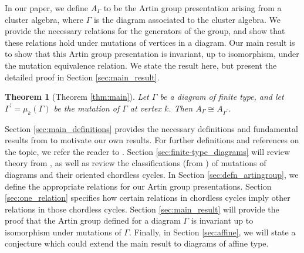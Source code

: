 \documentclass[11pt]{amsart}
\newtheorem{thm}{Theorem}[section]
\theoremstyle{definition}
\begin{document}


In our paper, we define $A_{\Gamma}$ to be the Artin group presentation arising from a cluster algebra, where $\Gamma$ is the diagram associated to the cluster algebra. We provide the necessary relations for the generators of the group, and show that these relations hold under mutations of vertices in a diagram. Our main result is to show that this Artin group presentation is invariant, up to isomorphism, under the mutation equivalence relation. We state the result here, but present the detailed proof in Section \ref{sec:main_result}.

\begin{thm}[Theorem \ref{thm:main}]
Let $\Gamma$ be a diagram of finite type, and let $\Gamma^{\prime} = \mu_k(\Gamma)$ be the mutation of $\Gamma$ at vertex $k$. Then $A_{\Gamma} \cong A_{\Gamma^{\prime}}$.
\end{thm}


\indent Section \ref{sec:main_definitions} provides the necessary definitions and fundamental results from \cite{BM13} to motivate our own results. For further definitions and references on the topic, we refer the reader to \cite{FZ02}. Section \ref{sec:finite-type_diagrams} will review theory from \cite{FZ02}, \cite{FZ03} as well as review the classifications (from \cite{BM13}) of mutations of diagrams and their oriented chordless cycles. In Section \ref{sec:defn_artingroup}, we define the appropriate relations for our Artin group presentations. Section \ref{sec:one_relation} specifies how certain relations in chordless cycles imply other relations in those chordless cycles. Section \ref{sec:main_result} will provide the proof that the Artin group defined for a diagram $\Gamma$ is invariant up to isomorphism under mutations of $\Gamma$. Finally, in Section \ref{sec:affine}, we will state a conjecture which could extend the main result to diagrams of affine type. \\
\end{document}
